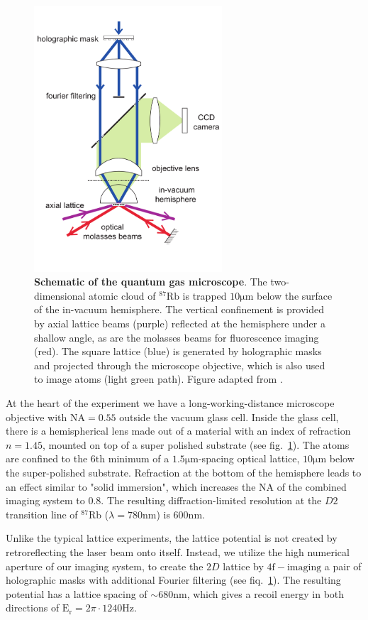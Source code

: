 \begin{figure}[t]
	\centering
	\includegraphics[width=70mm]{figures/QGM_setup.pdf}
	\caption{{\bf Schematic of the quantum gas microscope}. The two-dimensional atomic cloud of $^{87}\mathrm{Rb}$ is trapped $10\mathrm{\mu m}$ below the surface of the in-vacuum hemisphere. The vertical confinement is provided by axial lattice beams (purple) reflected at the hemisphere under a shallow angle, as are the molasses beams for fluorescence imaging (red). The square lattice (blue) is generated by holographic masks and projected through the microscope objective, which is also used to image atoms (light green path). Figure adapted from \cite{Bakr2009}.}
	\label{fig:QGM_QGM}
\end{figure}

At the heart of the experiment we have a long-working-distance microscope objective with $\textrm{NA} = 0.55$ outside the vacuum glass cell. Inside the glass cell, there is a hemispherical lens made out of a material with an index of refraction $n=1.45$, mounted on top of a super polished substrate (see fig.~\ref{fig:QGM_QGM}). The atoms are confined to the $6\mathrm{th}$ minimum of a $1.5\mathrm{\mu m}$-spacing optical lattice, $10\mathrm{\mu m}$ below the super-polished substrate. Refraction at the bottom of the hemisphere leads to an effect similar to "solid immersion", which increases the NA of the combined imaging system to $0.8$. The resulting diffraction-limited resolution at the $D2$ transition line of $^{87}\mathrm{Rb}$ ($\lambda = 780\mathrm{nm}$) is $600\mathrm{nm}$. 

Unlike the typical lattice experiments, the lattice potential is not created by retroreflecting the laser beam onto itself. Instead, we utilize the high numerical aperture of our imaging system, to create the $2D$ lattice by $4\mathrm{f-imaging}$ a pair of holographic masks with additional Fourier filtering (see fiq.~\ref{fig:QGM_QGM}). The resulting potential has a lattice spacing of $\sim680\mathrm{nm}$, which gives a recoil energy in both directions of $\mathrm{E_r} = 2\pi \cdot 1240\mathrm{Hz}$.

